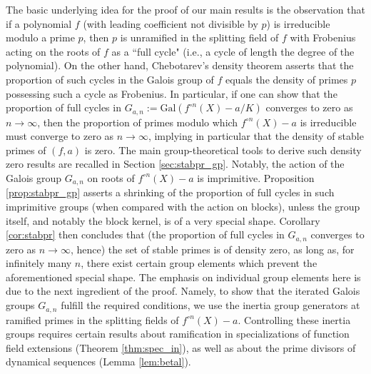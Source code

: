 \documentclass[a4paper]{amsart}
\begin{document}

  The basic underlying idea for the proof of our main results is the observation that if a polynomial $f$ (with leading coefficient not divisible by $p$) is irreducible modulo a prime $p$, then $p$ is unramified in the splitting field of $f$ with Frobenius acting on the roots of $f$ as a ``full cycle" (i.e., a cycle of length the degree of the polynomial). On the other hand, Chebotarev's density theorem asserts that the proportion of such cycles in the Galois group of $f$ equals the density of primes $p$ possessing such a cycle as Frobenius. In particular, if one can show that the proportion of full cycles in $G_{a,n}:=\textrm{Gal}(f^{\circ n}(X)-a/K)$ converges to zero as $n\to \infty$, then the proportion of primes modulo which $f^{\circ n}(X)-a$ is irreducible must converge to zero as $n\to \infty$, implying in particular that the density of stable primes of $(f,a)$ is zero. The main group-theoretical tools to derive such density zero results are recalled in Section \ref{sec:stabpr_gp}. Notably, the action of the Galois group $G_{a,n}$ on roots of $f^{\circ n}(X)-a$ is imprimitive.
  Proposition \ref{prop:stabpr_gp} asserts a shrinking of the proportion of full cycles in such imprimitive groups (when compared with the action on blocks), unless the group itself, and notably the block kernel, is of a very special shape. Corollary \ref{cor:stabpr} then concludes that (the proportion of full cycles in $G_{a,n}$ converges to zero as $n\to \infty$, hence) the set of stable primes is of density zero, as long as, for infinitely many $n$, there exist certain group elements which prevent the aforementioned special shape. The emphasis on individual group elements here is due to the next ingredient of the proof.
   Namely, to show that the iterated Galois groups $G_{a,n}$ fulfill the required conditions, we use the inertia group generators at ramified primes in the splitting fields of $f^{\circ n}(X)-a$. Controlling these inertia groups requires certain results about ramification in specializations of function field extensions (Theorem \ref{thm:spec_in}), as well as about the prime divisors of dynamical sequences (Lemma \ref{lem:betal}).
   
\end{document}
